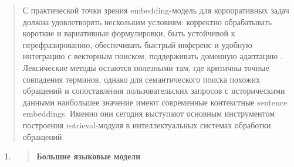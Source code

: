 \begin{quote}
С практической точки зрения embedding-модель для корпоративных задач
должна удовлетворять нескольким условиям: корректно обрабатывать
короткие и вариативные формулировки, быть устойчивой к перефразированию,
обеспечивать быстрый инференс и удобную интеграцию с векторным поиском,
поддерживать доменную адаптацию . Лексические методы остаются полезными
там, где критичны точные совпадения терминов, однако для семантического
поиска похожих обращений и сопоставления пользовательских запросов с
историческими данными наибольшее значение имеют современные контекстные
sentence embeddings. Именно они сегодня выступают основным инструментом
построения retrieval-модуля в интеллектуальных системах обработки
обращений.
\end{quote}

\begin{enumerate}
\def\labelenumi{\arabic{enumi}.}
\item
  \begin{quote}
  \textbf{Большие языковые модели}
  \end{quote}
\end{enumerate}

